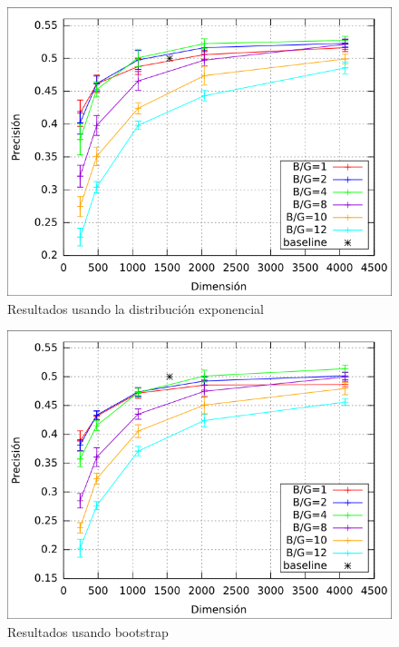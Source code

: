 			\begin{figure}[htbp!]
				\centering
				\centerline{
					\includegraphics[scale=0.6]{img/resultados/reales/expon.png}
				}
				\caption[Resultados expon]{Resultados usando la distribución exponencial}
				\label{fig: Reales-expon}
			\end{figure}
			\begin{figure}[htbp!]
				\centering
				\centerline{
					\includegraphics[scale=0.6]{img/resultados/reales/bootstrap.png}
				}
				\caption[Resultados bootstrap]{Resultados usando bootstrap}
				\label{fig: Reales-bootstrap}
			\end{figure}

